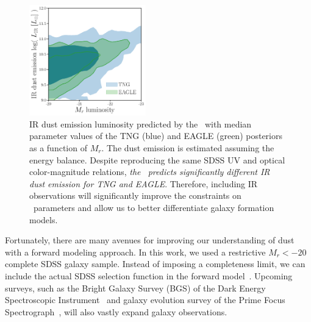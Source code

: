 \begin{figure}
\begin{center}
    \includegraphics[width=0.45\textwidth]{figs/abc_Lir.pdf}
    \caption{\label{fig:lir}
    IR dust emission luminosity predicted by the \eda~with median parameter
    values of the TNG (blue) and EAGLE (green) posteriors as a function of
    $M_r$. The dust emission is estimated assuming the \cite{dacunha2008}
    energy balance.  Despite reproducing the same SDSS UV and optical
    color-magnitude relations, \emph{the \eda~predicts significantly different
    IR dust emission for TNG and EAGLE}. Therefore, including IR
    observations will significantly improve the constraints on \eda~parameters
    and allow us to better differentiate galaxy formation models.
    }
\end{center}
\end{figure}

Fortunately, there are many avenues for improving our understanding of dust
with a forward modeling approach. In this work, we used a restrictive $M_r <
-20$ complete SDSS galaxy sample. 
Instead of imposing a completeness limit, 
we can include the actual SDSS selection function in the forward 
model~\citep[\eg~][]{dickey2020}. 
Upcoming surveys, such as the Bright Galaxy Survey (BGS) of the Dark Energy
Spectroscopic Instrument~\citep[DESI;][]{desicollaboration2016, ruiz-macias2020} 
and galaxy evolution survey of the Prime Focus
Spectrograph~\citep[PFS;][]{takada2014,tamura2016}, will also vastly expand galaxy
observations. 


